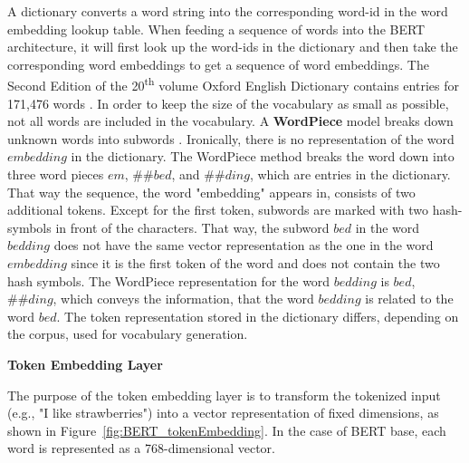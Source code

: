 A dictionary converts a word string into the corresponding word-id in the word embedding lookup table. 
When feeding a sequence of words into the BERT architecture, it will first look up the word-ids in the dictionary and then take the corresponding word embeddings to get a sequence of word embeddings.
The Second Edition of the 20\textsuperscript{th} volume Oxford English Dictionary contains entries for 171,476 words \cite{dictionary1989oxford}. In order to keep the size of the vocabulary as small as possible, not all words are included in the vocabulary. A \textbf{WordPiece} model breaks down unknown words into subwords \cite{wu2016google}. Ironically, there is no representation of the word $embedding$ in the dictionary. The WordPiece method breaks the word down into three word pieces $em$, $\#\#bed$, and $\#\#ding$, which are entries in the dictionary. That way the sequence, the word "embedding" appears in, consists of two additional tokens. Except for the first token, subwords are marked with two hash-symbols in front of the characters. That way, the subword $bed$ in the word $bedding$ does not have the same vector representation as the one in the word $embedding$ since it is the first token of the word and does not contain the two hash symbols. The WordPiece representation for the word $bedding$ is $bed$, $\#\#ding$, which conveys the information, that the word $bedding$ is related to the word $bed$.
The token representation stored in the dictionary differs, depending on the corpus, used for vocabulary generation.





\textbf{Token Embedding Layer}

The purpose of the token embedding layer is to transform the tokenized input (e.g., "I like strawberries") into a vector representation of fixed dimensions, as shown in Figure~\ref{fig:BERT_tokenEmbedding}. In the case of BERT base, each word is represented as a 768-dimensional vector.

